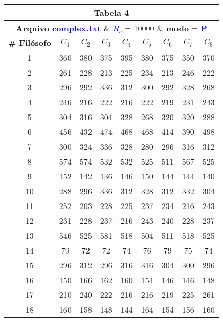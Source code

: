\documentclass[11pt]{article}
\begin{document}
\begin{table}[!h]
	\begin{center}
		\begin{tabular}{| c | c | c | c | c | c | c | c | c |}
		\hline
		\multicolumn{9}{|c|}{\textbf{Tabela 4}} \\ \hline
		\multicolumn{9}{|c|}{\textbf{Arquivo \textcolor{blue}{complex.txt}} \& \textbf{\textcolor{blue}{$R_c$}} = 10000 \& \textbf{modo} = \textbf{\textcolor{blue}{P}}} \\
		\hline
			\textbf{\# Filósofo} & \textbf{$C_1$} & \textbf{$C_2$} & \textbf{$C_3$} & \textbf{$C_4$} & \textbf{$C_5$} & \textbf{$C_6$} & \textbf{$C_7$} & \textbf{$C_8$} \\ \hline
			1  & 360 & 380 & 375 & 395 & 380 & 375 & 350 & 370 \\ \hline
			2  & 261 & 228 & 213 & 225 & 234 & 213 & 246 & 222 \\ \hline
			3  & 296 & 292 & 336 & 312 & 300 & 292 & 328 & 268 \\ \hline
			4  & 246 & 216 & 222 & 216 & 222 & 219 & 231 & 243 \\ \hline
			5  & 304 & 316 & 304 & 328 & 268 & 320 & 320 & 288 \\ \hline
			6  & 456 & 432 & 474 & 468 & 468 & 414 & 390 & 498 \\ \hline
			7  & 300 & 324 & 336 & 328 & 280 & 296 & 316 & 312 \\ \hline
			8  & 574 & 574 & 532 & 532 & 525 & 511 & 567 & 525 \\ \hline
			9  & 152 & 142 & 136 & 146 & 150 & 144 & 144 & 140 \\ \hline
			10 & 288 & 296 & 336 & 312 & 328 & 312 & 332 & 304 \\ \hline
			11 & 252 & 203 & 228 & 225 & 237 & 234 & 216 & 243 \\ \hline
			12 & 231 & 228 & 237 & 216 & 243 & 240 & 228 & 237 \\ \hline
			13 & 546 & 525 & 581 & 518 & 504 & 511 & 518 & 525 \\ \hline
			14 & 79  & 72  & 72  & 74  & 76  & 79  & 75  & 74  \\ \hline
			15 & 296 & 312 & 296 & 316 & 316 & 304 & 300 & 296 \\ \hline
			16 & 150 & 166 & 162 & 160 & 154 & 146 & 146 & 148 \\ \hline
			17 & 210 & 240 & 222 & 216 & 216 & 219 & 225 & 261 \\ \hline
			18 & 160 & 158 & 148 & 144 & 164 & 154 & 156 & 160 \\ \hline

\end{tabular}
\end{center}
\end{table}
\end{document}
